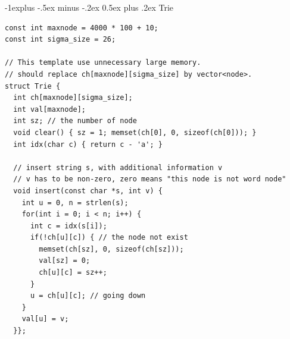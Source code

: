 \documentclass[10pt,landscape]{article}
\makeatletter
\renewcommand{\subsection}{\@startsection{subsection}{2}{0mm}%
                                {-1explus -.5ex minus -.2ex}%
                                {0.5ex plus .2ex}%
                                {\normalfont\normalsize\bfseries}}
\makeatother
\begin{document}
\begin{multicols}{2}
\subsection{Trie}
\begin{lstlisting}
const int maxnode = 4000 * 100 + 10;
const int sigma_size = 26;

// This template use unnecessary large memory.
// should replace ch[maxnode][sigma_size] by vector<node>.
struct Trie {
  int ch[maxnode][sigma_size];
  int val[maxnode];
  int sz; // the number of node
  void clear() { sz = 1; memset(ch[0], 0, sizeof(ch[0])); }
  int idx(char c) { return c - 'a'; }

  // insert string s, with additional information v
  // v has to be non-zero, zero means "this node is not word node" 
  void insert(const char *s, int v) {
    int u = 0, n = strlen(s);
    for(int i = 0; i < n; i++) {
      int c = idx(s[i]);
      if(!ch[u][c]) { // the node not exist
        memset(ch[sz], 0, sizeof(ch[sz]));
        val[sz] = 0;
        ch[u][c] = sz++;
      }
      u = ch[u][c]; // going down
    }
    val[u] = v;
  }};
\end{lstlisting}


\end{multicols}
\end{document}
